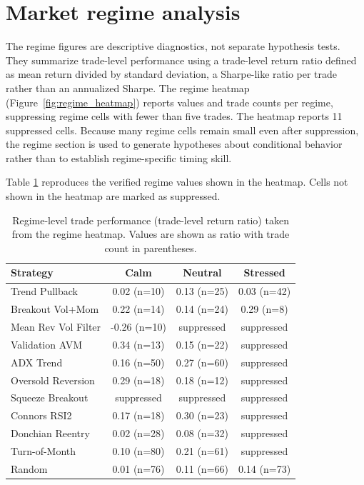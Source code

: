 \documentclass[preprint,12pt]{elsarticle}
\theoremstyle{definition}
\begin{document}
\section{Market regime analysis}

The regime figures are descriptive diagnostics, not separate hypothesis tests. They summarize trade-level performance using a trade-level return ratio defined as mean return divided by standard deviation, a Sharpe-like ratio per trade rather than an annualized Sharpe. The regime heatmap (Figure~\ref{fig:regime_heatmap}) reports values and trade counts per regime, suppressing regime cells with fewer than five trades. The heatmap reports 11 suppressed cells. Because many regime cells remain small even after suppression, the regime section is used to generate hypotheses about conditional behavior rather than to establish regime-specific timing skill.

Table \ref{tab:regimes} reproduces the verified regime values shown in the heatmap. Cells not shown in the heatmap are marked as suppressed.

\begin{table}[htbp]
\centering
\caption{Regime-level trade performance (trade-level return ratio) taken from the regime heatmap. Values are shown as ratio with trade count in parentheses.}
\label{tab:regimes}
\small
\renewcommand{\arraystretch}{1.1}
\begin{tabular}{lccc}
\toprule
Strategy & Calm & Neutral & Stressed \\
\midrule
Trend Pullback      & 0.02 (n=10) & 0.13 (n=25) & 0.03 (n=42) \\
Breakout Vol+Mom    & 0.22 (n=14) & 0.14 (n=24) & 0.29 (n=8) \\
Mean Rev Vol Filter & -0.26 (n=10) & suppressed & suppressed \\
Validation AVM      & 0.34 (n=13) & 0.15 (n=22) & suppressed \\
ADX Trend           & 0.16 (n=50) & 0.27 (n=60) & suppressed \\
Oversold Reversion  & 0.29 (n=18) & 0.18 (n=12) & suppressed \\
Squeeze Breakout    & suppressed & suppressed & suppressed \\
Connors RSI2        & 0.17 (n=18) & 0.30 (n=23) & suppressed \\
Donchian Reentry    & 0.02 (n=28) & 0.08 (n=32) & suppressed \\
Turn-of-Month       & 0.10 (n=80) & 0.21 (n=61) & suppressed \\
Random              & 0.01 (n=76) & 0.11 (n=66) & 0.14 (n=73) \\
\bottomrule
\end{tabular}
\end{table}
\end{document}
